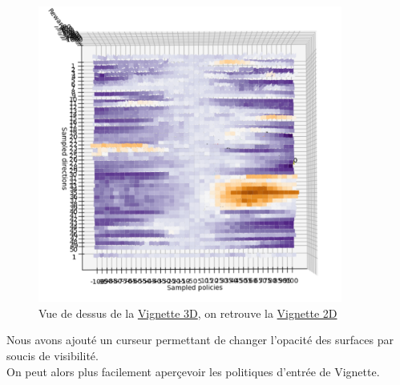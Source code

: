 \documentclass[12pt]{article}
\begin{document}
\begin{figure}[htp]
    \centering
    \includegraphics[width=10cm]{Images/vignette_dessus}
    \caption{Vue de dessus de la \hyperref[fig:vignette3D]{Vignette 3D}, on retrouve la \hyperref[fig:vignettePendulum]{Vignette 2D}}
    \label{fig:vignetteDessus}
\end{figure}

Nous avons ajouté un curseur permettant de changer l'opacité des surfaces par soucis de visibilité. \\

On peut alors plus facilement aperçevoir les politiques d'entrée de Vignette. \\
\end{document}
